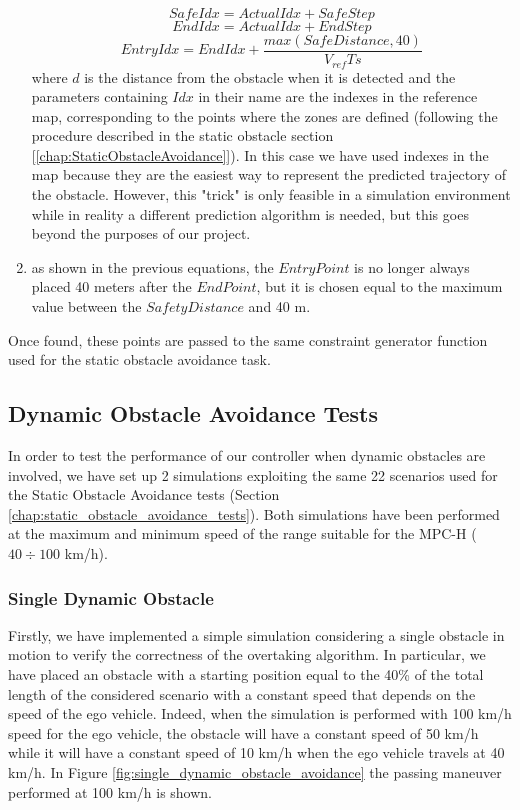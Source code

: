 \begin{enumerate}
\begin{equation}
            SafeIdx = ActualIdx+SafeStep
    \end{equation}
    \begin{equation}
            EndIdx = ActualIdx+EndStep
    \end{equation}
    \begin{equation}
            EntryIdx = EndIdx+\frac{max(SafeDistance,40)}{V_{ref}Ts}   
    \end{equation}
    where $d$ is the distance from the obstacle when it is detected and the parameters containing $Idx$ in their name are the indexes in the reference map, corresponding to the points where the zones are defined (following the procedure described in the static obstacle section [\ref{chap:StaticObstacleAvoidance}]).
    In this case we have used indexes in the map because they are the easiest way to represent the predicted trajectory of the obstacle. However, this "trick" is only feasible in a simulation environment while in reality a different prediction algorithm is needed, but this goes beyond the purposes of our project.
    \item as shown in the previous equations, the $EntryPoint$ is no longer always placed 40 meters after the $EndPoint$, but it is chosen equal to the maximum value between the $Safety Distance$ and 40 m.
\end{enumerate}
Once found, these points are passed to the same constraint generator function used for the static obstacle avoidance task.

\subsection{Dynamic Obstacle Avoidance Tests}
In order to test the performance of our controller when dynamic obstacles are involved, we have set up 2 simulations exploiting the same 22 scenarios used for the Static Obstacle Avoidance tests (Section \ref{chap:static_obstacle_avoidance_tests}). Both simulations have been performed at the maximum and minimum speed of the range suitable for the MPC-H ($40\div100$  km/h).  

\subsubsection{Single Dynamic Obstacle}
Firstly, we have implemented a simple simulation considering a single obstacle in motion to verify the correctness of the overtaking algorithm. In particular, we have placed an obstacle with a starting position equal to the 40\% of the total length of the considered scenario with a constant speed that depends on the speed of the ego vehicle. Indeed, when the simulation is performed with 100 km/h speed for the ego vehicle, the obstacle will have a constant speed of 50 km/h while it will have a constant speed of 10 km/h when the ego vehicle travels at 40 km/h. In Figure \ref{fig:single_dynamic_obstacle_avoidance} the passing maneuver performed at 100 km/h is shown.

